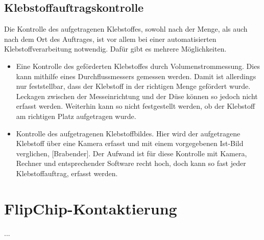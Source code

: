 \subsection{Klebstoffauftragskontrolle}
Die Kontrolle des aufgetragenen Klebstoffes, sowohl nach der Menge, als auch nach dem Ort des Auftrages, ist vor allem bei einer automatisierten Klebstoffverarbeitung notwendig. Dafür gibt es mehrere Möglichkeiten.
\begin{itemize}
    \item Eine Kontrolle des geförderten Klebstoffes durch Volumenstrommessung. Dies kann mithilfe eines Durchflussmessers gemessen werden. Damit ist allerdings nur feststellbar, dass der Klebstoff in der richtigen Menge gefördert wurde. Leckagen zwischen der Messeinrichtung und der Düse können so jedoch nicht erfasst werden. Weiterhin kann so nicht festgestellt werden, ob der Klebstoff am richtigen Platz aufgetragen wurde.
    \item Kontrolle des aufgetragenen Klebstoffbildes. Hier wird der aufgetragene Klebstoff über eine Kamera erfasst und mit einem vorgegebenen Ist-Bild verglichen, [Brabender]. Der Aufwand ist für diese Kontrolle mit Kamera, Rechner und entsprechender Software recht hoch, doch kann so fast jeder Klebstoffauftrag, erfasst werden.
\end{itemize}

\section{FlipChip-Kontaktierung}
\label{sec:kontaktierverfahren}
...

\clearpage










